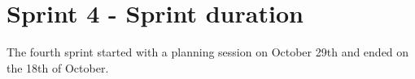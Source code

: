 \section{Sprint 4 - Sprint duration}
The fourth sprint started with a planning session on October 29th and ended on the 18th of October.  
\newline



